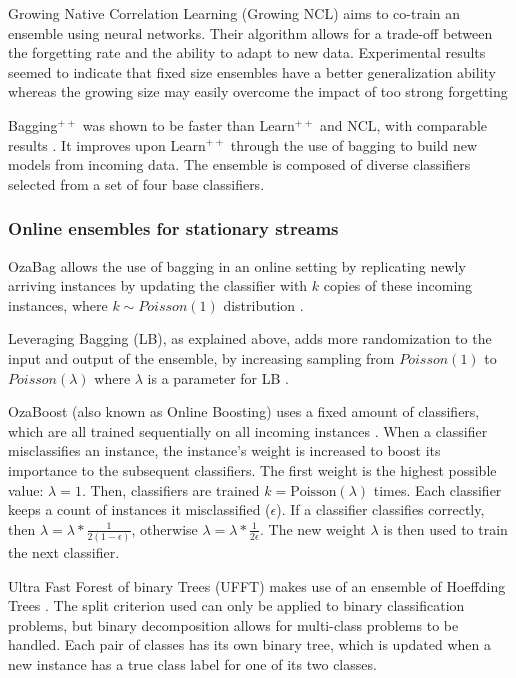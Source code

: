 Growing Native Correlation Learning (Growing NCL) aims to co-train an ensemble using neural networks. Their algorithm allows for a trade-off between the forgetting rate and the ability to adapt to new data. Experimental results seemed to indicate that fixed size ensembles have a better generalization ability whereas the growing size may easily overcome the impact of too strong forgetting \cite{minku2009negative, KRAWCZYK2017132}

Bagging$^{++}$ was shown to be faster than Learn$^{++}$ and NCL, with comparable results \cite{zhao2010incremental, KRAWCZYK2017132}. It improves upon Learn$^{++}$ through the use of bagging to build new models from incoming data. The ensemble is composed of diverse classifiers selected from a set of four base classifiers.

\subsubsection{Online ensembles for stationary streams}
OzaBag allows the use of bagging in an online setting by replicating newly arriving instances by updating the classifier with $k$ copies of these incoming instances, where $k \sim Poisson(1)$ distribution \cite{oza2005online, KRAWCZYK2017132, }.

Leveraging Bagging (LB), as explained above, adds more randomization to the input and output of the ensemble, by increasing sampling from $Poisson(1)$ to $Poisson(\lambda)$ where $\lambda$ is a parameter for LB \cite{bifet2010leveraging, KRAWCZYK2017132}.

OzaBoost (also known as Online Boosting) uses a fixed amount of classifiers, which are all trained sequentially on all incoming instances \cite{oza2005online, KRAWCZYK2017132, }. When a classifier misclassifies an instance, the instance's weight is increased to boost its importance to the subsequent classifiers. The first weight is the highest possible value: $\lambda=1$. Then, classifiers are trained $k=\text{Poisson}(\lambda)$ times. Each classifier keeps a count of instances it misclassified ($\epsilon$). If a classifier classifies correctly, then $\lambda = \lambda * \frac{1}{2(1-\epsilon)}$, otherwise $\lambda = \lambda * \frac{1}{2\epsilon}$. The new weight $\lambda$ is then used to train the next classifier.

Ultra Fast Forest of binary Trees (UFFT) makes use of an ensemble of Hoeffding Trees \cite{gama2005learning, KRAWCZYK2017132, }. The split criterion used can only be applied to binary classification problems, but binary decomposition allows for multi-class problems to be handled. Each pair of classes has its own binary tree, which is updated when a new instance has a true class label for one of its two classes.

